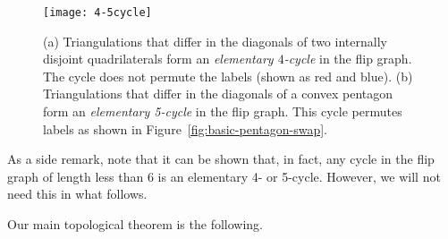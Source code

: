 \begin{figure}
\begin{centering}
\texttt{[image: 4-5cycle]}
\par\end{centering}
\protect\caption{(a) Triangulations that differ in the diagonals of two internally
disjoint quadrilaterals form an \emph{elementary $4$-cycle} in the flip graph.  The cycle does not permute the labels (shown as red and blue).  (b)  Triangulations that differ in the diagonals of a convex pentagon form an \emph{elementary 5-cycle} in the flip graph. 
This cycle permutes labels as shown in Figure~\ref{fig:basic-pentagon-swap}.}
\label{4-5cycle}
\end{figure}



As a side remark, note that it can be shown that, in fact, any cycle in the flip graph of length less than 6 is an elementary 4- or 5-cycle. However, we will not need this in what follows.



Our main topological theorem is the following.

